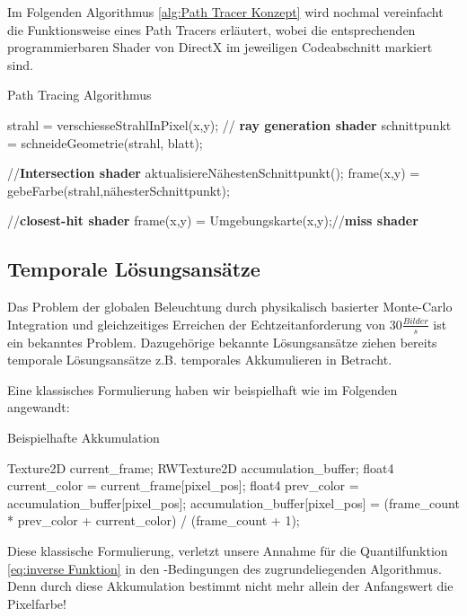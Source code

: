 \newpage
Im Folgenden Algorithmus \ref{alg:Path Tracer Konzept} wird nochmal vereinfacht die Funktionsweise 
eines Path Tracers erläutert, wobei die entsprechenden programmierbaren Shader von DirectX 
im jeweiligen Codeabschnitt markiert sind.

\begin{tcolorbox}
\begin{algorithm}[H]
    \caption{Path Tracing Algorithmus}
    \begin{algorithmic}[1]
        \State strahl = verschiesseStrahlInPixel(x,y); // \textbf{ray generation shader}
        \State schnittpunkt = schneideGeometrie(strahl, blatt);\par
        //\textbf{Intersection shader}
        \State aktualisiereNähestenSchnittpunkt();
        \EndIf
        \EndFor
        \State frame(x,y) = gebeFarbe(strahl,nähesterSchnittpunkt);\par
        //\textbf{closest-hit shader}
        \Else
        \State frame(x,y) = Umgebungskarte(x,y);//\textbf{miss shader}
        \EndIf
        \EndFor
        \EndProcedure
    \end{algorithmic}
    \label{alg:Path Tracer Konzept}
\end{algorithm}
\end{tcolorbox}

\subsection{Temporale Lösungsansätze}
\label{ch:Content1:subsec:Bisherige Temporalansätze}

Das Problem der globalen Beleuchtung durch physikalisch basierter Monte-Carlo Integration und gleichzeitiges Erreichen der 
Echtzeitanforderung von 30$\frac{Bilder}{s}$ ist ein bekanntes Problem. Dazugehörige bekannte Lösungsansätze 
ziehen bereits temporale Lösungsansätze z.B. temporales Akkumulieren \cite{schied2017spatiotemporal} in Betracht. 
\par 

Eine klassisches Formulierung \cite{UE4TAA} haben wir beispielhaft wie im Folgenden angewandt:

\begin{tcolorbox}
  \begin{algorithm}[H]
    \caption{Beispielhafte Akkumulation}
    \begin{algorithmic}[1]
        \State Texture2D current\_frame;
        \State RWTexture2D accumulation\_buffer;
        \State float4 current\_color = current\_frame[pixel\_pos];
        \State float4 prev\_color = accumulation\_buffer[pixel\_pos];
        \State accumulation\_buffer[pixel\_pos] = 
        \State (frame\_count * prev\_color + current\_color) / (frame\_count + 1);
    \end{algorithmic}
    \label{alg:TemporalAccumulation}
\end{algorithm}
\end{tcolorbox}

Diese klassische Formulierung, verletzt unsere Annahme für die Quantilfunktion \ref{eq:inverse Funktion}
in den -Bedingungen des zugrundeliegenden Algorithmus. 
Denn durch diese Akkumulation bestimmt nicht mehr allein der Anfangswert die Pixelfarbe!




